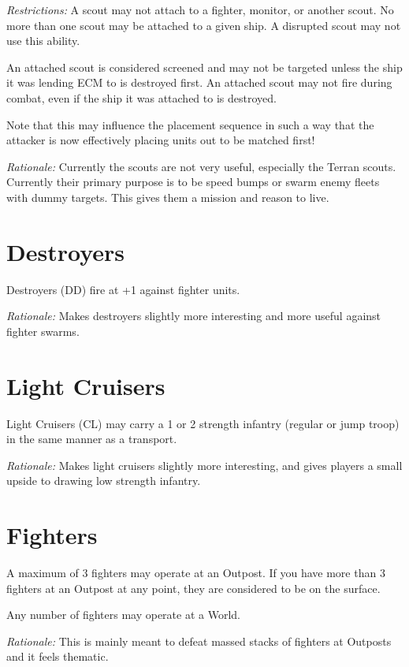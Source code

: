 \documentclass[a4paper,11pt]{article}
\begin{document}
\textit{Restrictions:} A scout may not attach to a fighter, monitor, or another scout. No more than one scout may be attached to a given ship. A disrupted scout may not use this ability.

An attached scout is considered screened and may not be targeted unless the ship it was lending ECM to is destroyed first. An attached scout may not fire during combat, even if the ship it was attached to is destroyed.

Note that this may influence the placement sequence in such a way that the attacker is now effectively placing units out to be matched first!

\textit{Rationale:} Currently the scouts are not very useful, especially the Terran scouts. Currently their primary purpose is to be speed bumps or swarm enemy fleets with dummy targets. This gives them a mission and reason to live.

\section{Destroyers}

Destroyers (DD) fire at +1 against fighter units.

\textit{Rationale:} Makes destroyers slightly more interesting and more useful against fighter swarms.

\section{Light Cruisers}

Light Cruisers (CL) may carry a 1 or 2 strength infantry (regular or jump troop) in the same manner as a transport.

\textit{Rationale:} Makes light cruisers slightly more interesting, and gives players a small upside to drawing low strength infantry.

\section{Fighters}

A maximum of 3 fighters may operate at an Outpost. If you have more than 3 fighters at an Outpost at any point, they are considered to be on the surface.

Any number of fighters may operate at a World.

\textit{Rationale:} This is mainly meant to defeat massed stacks of fighters at Outposts and it feels thematic.
\end{document}
